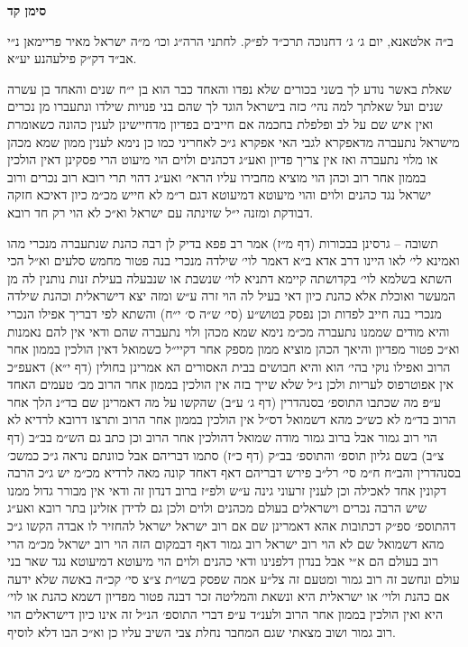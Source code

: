 \documentclass[12pt, openany]{book}
\newcommand{\chapname}{}
\newcommand{\newchap}[1]{
	\addcontentsline{toc}{chapter}{#1}
	\renewcommand{\chapname}{#1}
		\begin{center}
			\textbf{%
\fontsize{16pt}{16pt}\selectfont
				#1}
		\end{center}
}
\begin{document}
\newchap{סימן קד}
\begin{multicols}{2}
ב״ה אלטאנא, יום ג׳ ג׳ דחנוכה תרכ״ד לפ״ק. לחתני הרה״ג וכו׳ מ״ה ישראל מאיר פריימאן נ״י אב״ד דק״ק פילעהנע יע״א.\\\vspace{0pt}

שאלת באשר נודע לך בשני בכורים שלא נפדו והאחד כבר הוא בן י״ח שנים והאחד בן עשרה שנים ועל שאלתך למה נהי׳ כזה בישראל הוגד לך שהם בני פנויות שילדו ונתעברו מן נכרים ואין איש שם על לב ופלפלת בחכמה אם חייבים בפדיון מדחיישינן לענין כהונה כשאומרת מישראל נתעברה מדאפקרא לגבי האי אפקרא ג״כ לאחריני כמו כן נימא לענין ממון שמא מכהן או מלוי נתעברה ואז אין צריך פדיון ואע״ג דכהנים ולוים הוי מיעוט הרי פסקינן דאין הולכין בממון אחר רוב וכהן הוי מוציא מחבירו עליו הראי׳ ואע״ג דהוי תרי רובא רוב נכרים ורוב ישראל נגד כהנים ולוים והוי מיעוטא דמיעוטא דגם ר״מ לא חייש מכ״מ כיון דאיכא חזקה דבודקת ומזנה י״ל שזינתה עם ישראל וא״כ לא הוי רק חד רובא.\\\vspace{0pt}

תשובה – גרסינן בבכורות (דף מ״ז) אמר רב פפא בדיק לן רבה כהנת שנתעברה מנכרי מהו ואמינא לי׳ לאו היינו דרב אדא ב״א דאמר לוי׳ שילדה מנכרי בנה פטור מחמש סלעים וא״ל הכי השתא בשלמא לוי׳ בקדושתה קיימא דתניא לוי׳ שנשבת או שנבעלה בעילת זנות נותנין לה מן המעשר ואוכלת אלא כהנת כיון דאי בעיל לה הוי זרה ע״ש ומזה יצא דישראלית וכהנת שילדה מנכרי בנה חייב לפדות וכן נפסק בטוש״ע (סי׳ ש״ה ס׳ י״ח) והשתא לפי דבריך אפילו הנכרי והיא מודים שממנו נתעברה מכ״מ נימא שמא מכהן ולוי נתעברה שהם ודאי אין להם נאמנות וא״כ פטור מפדיון והיאך הכהן מוציא ממון מספק אחר דקיי״ל כשמואל דאין הולכין בממון אחר הרוב ואפילו נוקי בהי׳ הוא והיא חבושים בבית האסורים הא אמרינן בחולין (דף י״א) דאעפ״כ אין אפוטרפוס לעריות ולכן נ״ל שלא שייך בזה אין הולכין בממון אחר הרוב מב׳ טעמים האחד ע״פ מה שכתבו התוספ׳ בסנהדרין (דף ג׳ ע״ב) שהקשו על מה דאמרינן שם בד״נ הלך אחר הרוב בד״מ לא כש״כ מהא דשמואל דס״ל אין הולכין בממון אחר הרוב ותרצו דרובא לרדיא לא הוי רוב גמור אבל ברוב גמור מודה שמואל דהולכין אחר הרוב וכן כתב גם הש״מ בב״ב (דף צ״ב) בשם גליון תוספ׳ והתוספ׳ בב״ק (דף כ״ז) סתמו דבריהם אבל כוונתם נראה ג״כ כמשכ׳ בסנהדרין והב״ח ח״מ סי׳ רל״ב פירש דבריהם דאף דאחד קונה מאה לרדיא מכ״מ יש ג״כ הרבה דקונין אחד לאכילה וכן לענין זרעוני גינה ע״ש ולפ״ז ברוב דנדון זה ודאי אין מבורר גדול ממנו שיש הרבה נכרים וישראלים בעולם מכהנים ולוים ולכן גם לדידן אזלינן בתר רובא ואע״ג דהתוספ׳ ספ״ק דכתובות אהא דאמרינן שם אם רוב ישראל ישראל להחזיר לו אבדה הקשו ג״כ מהא דשמואל שם לא הוי רוב ישראל רוב גמור דאף דבמקום הזה הוי רוב ישראל מכ״מ הרי רוב בעולם הם א״י אבל בנדון דלפנינו ודאי כהנים ולוים הוי מיעוטא דמיעוטא נגד שאר בני עולם ונחשב זה רוב גמור ומטעם זה צל״ע אמה שפסק בשו״ת צ״צ סי׳ קכ״ה באשה שלא ידעה אם כהנת ולוי׳ או ישראלית היא ונשאת והמליטה זכר דבנה פטור מפדיון דשמא כהנת או לוי׳ היא ואין הולכין בממון אחר הרוב ולענ״ד ע״פ דברי התוספ׳ הנ״ל זה אינו כיון דישראלים הוי רוב גמור ושוב מצאתי שגם המחבר נחלת צבי השיב עליו כן וא״כ הבו דלא לוסיף.\\\vspace{0pt}


\end{multicols}
\end{document}
